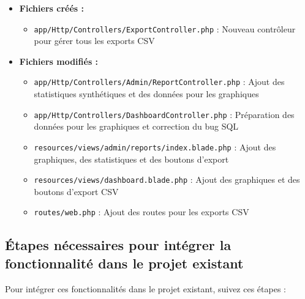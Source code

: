 \documentclass[a4paper,12pt]{report}
\begin{document}
  \begin{itemize}
    \item \textbf{Fichiers créés :}
    \begin{itemize}
      \item \texttt{app/Http/Controllers/ExportController.php} : Nouveau contrôleur pour gérer tous les exports CSV
    \end{itemize}
    
    \item \textbf{Fichiers modifiés :}
    \begin{itemize}
      \item \texttt{app/Http/Controllers/Admin/ReportController.php} : Ajout des statistiques synthétiques et des données pour les graphiques
      \item \texttt{app/Http/Controllers/DashboardController.php} : Préparation des données pour les graphiques et correction du bug SQL
      \item \texttt{resources/views/admin/reports/index.blade.php} : Ajout des graphiques, des statistiques et des boutons d'export
      \item \texttt{resources/views/dashboard.blade.php} : Ajout des graphiques et des boutons d'export CSV
      \item \texttt{routes/web.php} : Ajout des routes pour les exports CSV
    \end{itemize}
  \end{itemize}

\newpage
  \subsection{Étapes nécessaires pour intégrer la fonctionnalité dans le projet existant}
  Pour intégrer ces fonctionnalités dans le projet existant, suivez ces étapes :
  
\end{document}
